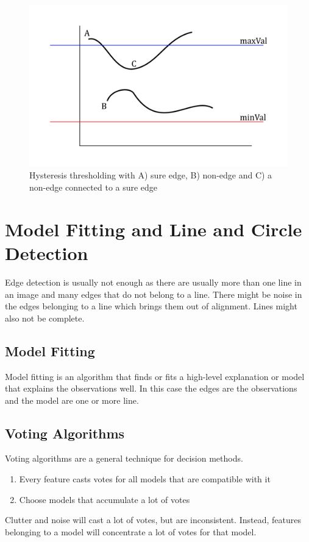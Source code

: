 \documentclass[x11names,11pt,a4paper]{article}
\theoremstyle{definition}
\begin{document}
\begin{figure}[H]
	\centering
	\includegraphics[keepaspectratio,width=0.6\linewidth]{hysteresis_thresholding}
	\caption{Hysteresis thresholding with A) sure edge, B) non-edge and C) a non-edge connected to a sure edge}
\end{figure}

\section{Model Fitting and Line and Circle Detection}
Edge detection is usually not enough as there are usually more than one line in an image and many edges that do not belong to a line. There might be noise in the edges belonging to a line which brings them out of alignment. Lines might also not be complete.

\subsection{Model Fitting}
Model fitting is an algorithm that finds or fits a high-level explanation or model that explains the observations well. In this case the edges are the observations and the model are one or more line.

\subsection{Voting Algorithms}
Voting algorithms are a general technique for decision methods.

\begin{enumerate}
	\item Every feature casts votes for all models that are compatible with it
	\item Choose models that accumulate a lot of votes
\end{enumerate}

Clutter and noise will cast a lot of votes, but are inconsistent. Instead, features belonging to a model will concentrate a lot of votes for that model.
\end{document}

